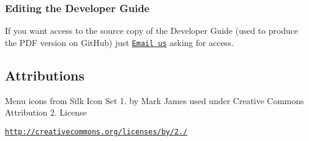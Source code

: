 \subsubsection*{Editing the Developer Guide}


\begin{DoxyItemize}
\item If you want access to the source copy of the Developer Guide (used to produce the P\+DF version on Git\+Hub) just \href{mailto:railwayfeedback@gmail.com}{\tt Email us} asking for access.
\end{DoxyItemize}

\subsection*{Attributions}

Menu icons from Silk Icon Set 1. by Mark James used under Creative Commons Attribution 2. License

\href{http://creativecommons.org/licenses/by/2.5/}{\tt http\+://creativecommons.\+org/licenses/by/2./} 